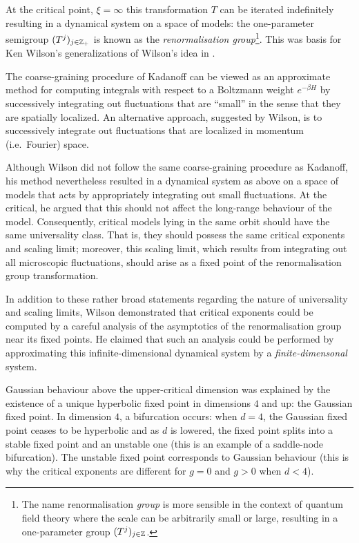 At the critical point, $\xi = \infty$ this transformation
$T$ can be iterated indefinitely resulting in a dynamical system on a space
of models: the one-parameter semigroup $(T^j)_{j\in{\mathbb Z}_+}$ is known as the
\emph{renormalisation group}\footnote{The name
renormalisation \emph{group} is more sensible in the context of quantum field
theory where the scale can be arbitrarily small or large, resulting in a
one-parameter group $(T^j)_{j\in{\mathbb Z}}$.}. This was basis for Ken Wilson's
generalizations of Wilson's idea in \cite{Wils71I,Wils71II}.

The coarse-graining procedure of Kadanoff can be viewed as an approximate
method for computing integrals with respect to a Boltzmann weight $e^{-\beta H}$
by successively integrating out fluctuations that are ``small'' in the sense
that they are spatially localized. An alternative approach, suggested by
Wilson, is to successively integrate out fluctuations that are localized in
momentum (i.e.\ Fourier) space. 

Although Wilson did not follow the same coarse-graining procedure as Kadanoff,
his method nevertheless resulted in a dynamical system as above on a space of
models that acts by appropriately integrating out small fluctuations. At the
critical, he argued that this should not affect the long-range behaviour of
the model. Consequently, critical models lying in the same orbit should have
the same universality class. That is, they should possess the same critical
exponents and scaling limit; moreover, this scaling limit, which results from
integrating out all microscopic fluctuations, should arise as a fixed point
of the renormalisation group transformation.

In addition to these rather broad statements regarding the nature of universality
and scaling limits, Wilson demonstrated that critical exponents could be computed
by a careful analysis of the asymptotics of the renormalisation group near its
fixed points. He claimed that such an analysis could be performed by approximating
this infinite-dimensional dynamical system by a \emph{finite-dimensonal} system.

Gaussian behaviour above the upper-critical dimension was explained by the
existence of a unique hyperbolic fixed point in dimensions $4$ and up: the Gaussian
fixed point. In dimension $4$, a bifurcation occurs: when $d = 4$, the Gaussian
fixed point ceases to be hyperbolic and as $d$ is lowered, the fixed point splits
into a stable fixed point and an unstable one (this is an example of a saddle-node
bifurcation). The unstable fixed point corresponds to Gaussian behaviour (this is
why the critical exponents are different for $g = 0$ and $g > 0$ when $d < 4$).

